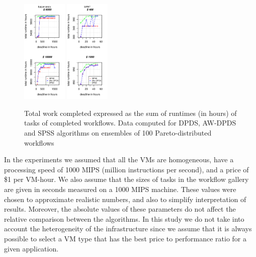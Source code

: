 \documentclass{sig-alternate}
\begin{document}
\begin{figure}[t]
\includegraphics[width=0.19\textwidth]{figures/pareto-size-GENOME-n-1000-8-dagh100-1500m0.pdf}
\includegraphics[width=0.19\textwidth]{figures/pareto-size-SIPHT-n-1000-8-dagh5-50m0.pdf}
\caption{ Total work completed expressed as the sum of runtimes (in hours) of
tasks of completed workflows. Data computed for DPDS, AW-DPDS and SPSS
algorithms on ensembles of 100 Pareto-distributed workflows}
\label{fig:total-time}
\end{figure}

In the experiments we assumed that all the VMs are homogeneous, have a
processing speed of 1000 MIPS (million instructions per second), and a price of
\$1 per VM-hour. We also assume that the sizes of tasks in the workflow gallery
are given in seconds measured on a 1000 MIPS machine. These values were chosen
to approximate realistic numbers, and also to simplify interpretation of
results. Moreover, the absolute values of these parameters do not affect the
relative comparison between the algorithms. In this study we do not take into
account the heterogeneity of the infrastructure since we assume that it is
always possible to select a VM type that has the best price to performance ratio
for a given application.
\end{document}

